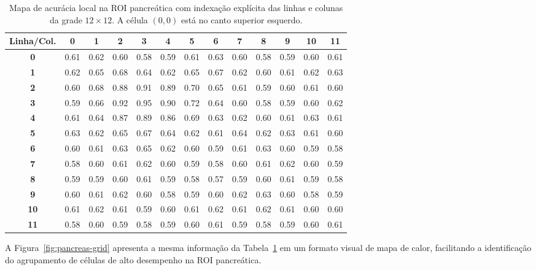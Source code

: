 \documentclass[11pt,a4paper]{article}
\begin{document}
\begin{table}[htbp]
\centering
\caption{Mapa de acurácia local na ROI pancreática com indexação explícita das linhas e colunas da grade \(12\times 12\). A célula \((0,0)\) está no canto superior esquerdo.}
\label{tab:pancreas-grid-indexado}
\scriptsize
\setlength{\tabcolsep}{3.8pt}
\renewcommand{\arraystretch}{1.1}
\begin{tabular}{c|cccccccccccc}
\toprule
\textbf{Linha/Col.} & \textbf{0} & \textbf{1} & \textbf{2} & \textbf{3} & \textbf{4} & \textbf{5} & \textbf{6} & \textbf{7} & \textbf{8} & \textbf{9} & \textbf{10} & \textbf{11} \\
\midrule
\textbf{0}  & 0.61 & 0.62 & 0.60 & 0.58 & 0.59 & 0.61 & 0.63 & 0.60 & 0.58 & 0.59 & 0.60 & 0.61 \\
\textbf{1}  & 0.62 & 0.65 & 0.68 & 0.64 & 0.62 & 0.65 & 0.67 & 0.62 & 0.60 & 0.61 & 0.62 & 0.63 \\
\textbf{2}  & 0.60 & 0.68 & 0.88 & 0.91 & 0.89 & 0.70 & 0.65 & 0.61 & 0.59 & 0.60 & 0.61 & 0.60 \\
\textbf{3}  & 0.59 & 0.66 & 0.92 & 0.95 & 0.90 & 0.72 & 0.64 & 0.60 & 0.58 & 0.59 & 0.60 & 0.62 \\
\textbf{4}  & 0.61 & 0.64 & 0.87 & 0.89 & 0.86 & 0.69 & 0.63 & 0.62 & 0.60 & 0.61 & 0.63 & 0.61 \\
\textbf{5}  & 0.63 & 0.62 & 0.65 & 0.67 & 0.64 & 0.62 & 0.61 & 0.64 & 0.62 & 0.63 & 0.61 & 0.60 \\
\textbf{6}  & 0.60 & 0.61 & 0.63 & 0.65 & 0.62 & 0.60 & 0.59 & 0.61 & 0.63 & 0.60 & 0.59 & 0.58 \\
\textbf{7}  & 0.58 & 0.60 & 0.61 & 0.62 & 0.60 & 0.59 & 0.58 & 0.60 & 0.61 & 0.62 & 0.60 & 0.59 \\
\textbf{8}  & 0.59 & 0.59 & 0.60 & 0.61 & 0.59 & 0.58 & 0.57 & 0.59 & 0.60 & 0.61 & 0.59 & 0.58 \\
\textbf{9}  & 0.60 & 0.61 & 0.62 & 0.60 & 0.58 & 0.59 & 0.60 & 0.62 & 0.63 & 0.60 & 0.58 & 0.59 \\
\textbf{10} & 0.61 & 0.62 & 0.61 & 0.59 & 0.60 & 0.61 & 0.62 & 0.61 & 0.62 & 0.61 & 0.60 & 0.60 \\
\textbf{11} & 0.58 & 0.60 & 0.59 & 0.58 & 0.59 & 0.60 & 0.61 & 0.59 & 0.58 & 0.59 & 0.60 & 0.61 \\
\bottomrule
\end{tabular}
\end{table}

A Figura~\ref{fig:pancreas-grid} apresenta a mesma informação da Tabela~\ref{tab:pancreas-grid-indexado} em um formato visual de mapa de calor, facilitando a identificação do agrupamento de células de alto desempenho na ROI pancreática.
\end{document}
